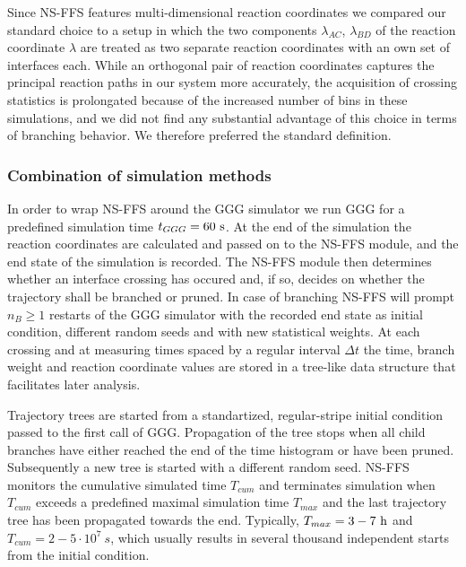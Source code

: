 \documentclass[a4paper,10pt]{article}
\newcommand{\unit}[1]{{\rm #1}}
\begin{document}
Since NS-FFS features multi-dimensional reaction coordinates we compared our standard choice to a setup in which the two 
components $\lambda_{AC}$, $\lambda_{BD}$ of the reaction coordinate $\lambda$ are treated as two separate reaction coordinates 
with an own set of interfaces each.
While an orthogonal pair of reaction coordinates captures the principal reaction paths in our system more accurately,
the acquisition of crossing statistics is prolongated because of the increased number of bins in these simulations,
and we did not find any substantial advantage of this choice in terms of branching behavior.
We therefore preferred the standard definition.
 

\subsubsection*{Combination of simulation methods}
In order to wrap NS-FFS around the GGG simulator we run GGG for a predefined
simulation time $t_{GGG}=60~\unit{s}$. 
At the end of the simulation the reaction coordinates are calculated
and passed on to the NS-FFS module, and the end state of the simulation is recorded.
The NS-FFS module then determines whether an interface crossing has occured and, if so,
decides on whether the trajectory shall be branched or pruned.
In case of branching NS-FFS will prompt $n_B \geq 1$ restarts of the GGG simulator
with the recorded end state as initial condition, different random seeds and with new statistical weights.
At each crossing and at measuring times spaced by a regular interval $\Delta t$ the time, branch weight
and reaction coordinate values are stored in a tree-like data structure that facilitates later analysis.

Trajectory trees are started from a standartized, regular-stripe initial condition passed to the first call of GGG.
Propagation of the tree stops when all child branches have either reached the end of the time histogram or have been pruned.
Subsequently a new tree is started with a different random seed.
NS-FFS monitors the cumulative simulated time $T_{cum}$ and terminates simulation
when $T_{cum}$ exceeds a predefined maximal simulation time $T_{max}$ and the last 
trajectory tree has been propagated towards the end.
Typically, $T_{max}=3-7~\unit{h}$ and $T_{cum}=2-5\cdot10^{7}~s$,
which usually results in several thousand independent starts from the initial condition.
\end{document}
